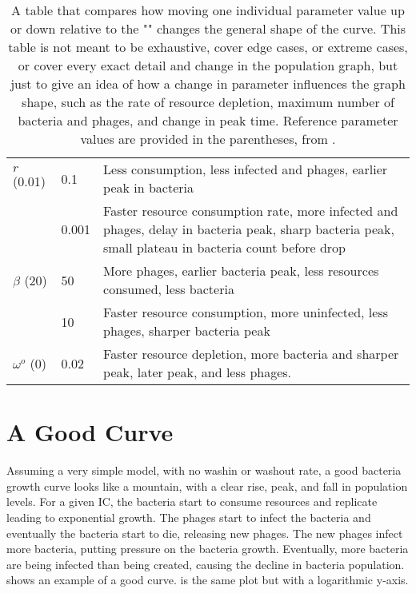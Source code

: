 \begin{table}
\begin{tabularx}{\textwidth}{l l X}
        \midrule
        $r$ (0.01) & 0.1 & Less consumption, less infected and phages, earlier peak in bacteria\\
         & 0.001 & Faster resource consumption rate, more infected and phages, delay in bacteria peak, sharp bacteria peak, small plateau in bacteria count before drop\\

        \midrule
        $\beta$ (20) & 50 & More phages, earlier bacteria peak, less resources consumed, less bacteria\\
         & 10 & Faster resource consumption, more uninfected, less phages, sharper bacteria peak\\

        \midrule
        $\omega^o$ (0) & 0.02 & Faster resource depletion, more bacteria and sharper peak, later peak, and less phages. \\

        \bottomrule
    \end{tabularx}
    \caption{
        A table that compares how moving one individual parameter value up or down relative to the "" changes the general shape of the curve. 
        This table is not meant to be exhaustive, cover edge cases, or extreme cases, or cover every exact detail and change in the population graph, but just to give an idea of how a change in parameter influences the graph shape, such as the rate of resource depletion, maximum number of bacteria and phages, and change in peak time. 
        Reference parameter values are provided in the parentheses, from . 
    }
    \label{tab:results:graph_behavior}
\end{table}


\section{A Good Curve}
\label{sec:results:a_good_curve}
Assuming a very simple model, with no washin or washout rate, a good bacteria growth curve looks like a mountain, with a clear rise, peak, and fall in population levels. 
For a given IC, the bacteria start to consume resources and replicate leading to exponential growth. 
The phages start to infect the bacteria and eventually the bacteria start to die, releasing new phages. 
The new phages infect more bacteria, putting pressure on the bacteria growth. 
Eventually, more bacteria are being infected than being created, causing the decline in bacteria population. 
 shows an example of a good curve. 
 is the same plot but with a logarithmic y-axis. 

